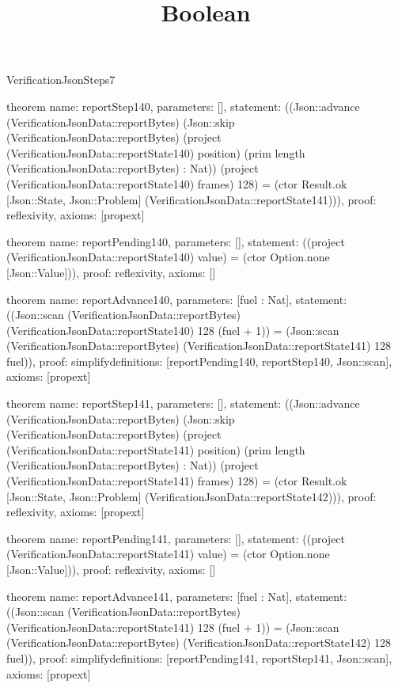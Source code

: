 \begin{lexlean}{VerificationJsonSteps7}
\title{Boolean}
\begin{semanticmodule}

theorem{
  name: reportStep140,
  parameters: [],
  statement: ((Json::advance (VerificationJsonData::reportBytes) (Json::skip (VerificationJsonData::reportBytes) (project (VerificationJsonData::reportState140) position) (prim length (VerificationJsonData::reportBytes) : Nat)) (project (VerificationJsonData::reportState140) frames) 128) = (ctor Result.ok [Json::State, Json::Problem] (VerificationJsonData::reportState141))),
  proof: reflexivity{},
  axioms: [propext]
}

theorem{
  name: reportPending140,
  parameters: [],
  statement: ((project (VerificationJsonData::reportState140) value) = (ctor Option.none [Json::Value])),
  proof: reflexivity{},
  axioms: []
}

theorem{
  name: reportAdvance140,
  parameters: [fuel : Nat],
  statement: ((Json::scan (VerificationJsonData::reportBytes) (VerificationJsonData::reportState140) 128 (fuel + 1)) = (Json::scan (VerificationJsonData::reportBytes) (VerificationJsonData::reportState141) 128 fuel)),
  proof: simplify{definitions: [reportPending140, reportStep140, Json::scan]},
  axioms: [propext]
}

theorem{
  name: reportStep141,
  parameters: [],
  statement: ((Json::advance (VerificationJsonData::reportBytes) (Json::skip (VerificationJsonData::reportBytes) (project (VerificationJsonData::reportState141) position) (prim length (VerificationJsonData::reportBytes) : Nat)) (project (VerificationJsonData::reportState141) frames) 128) = (ctor Result.ok [Json::State, Json::Problem] (VerificationJsonData::reportState142))),
  proof: reflexivity{},
  axioms: [propext]
}

theorem{
  name: reportPending141,
  parameters: [],
  statement: ((project (VerificationJsonData::reportState141) value) = (ctor Option.none [Json::Value])),
  proof: reflexivity{},
  axioms: []
}

theorem{
  name: reportAdvance141,
  parameters: [fuel : Nat],
  statement: ((Json::scan (VerificationJsonData::reportBytes) (VerificationJsonData::reportState141) 128 (fuel + 1)) = (Json::scan (VerificationJsonData::reportBytes) (VerificationJsonData::reportState142) 128 fuel)),
  proof: simplify{definitions: [reportPending141, reportStep141, Json::scan]},
  axioms: [propext]
}


\end{semanticmodule}
\end{lexlean}
